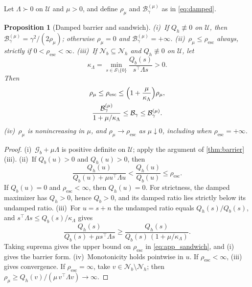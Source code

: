 \documentclass[11pt]{article}
\newtheorem{proposition}{Proposition}
\newcommand{\Gb}{\mathcal{G}_{b}}
\newcommand{\Resc}{\rho_{\mathrm{esc}}}
\newcommand{\Barrier}{\mathcal{B}}
\newcommand{\U}{\mathcal{U}}
\newcommand{\rhoreg}{\rho_{\mu}}
\newcommand{\Nb}{\mathcal{N}_{b}}
\newcommand{\Nh}{\mathcal{N}_{h}}
\begin{document}
Let $\Lambda\succ0$ on $\U$ and $\mu>0$, and define $\rhoreg$ and $\Barrier^{(\mu)}_\gamma$ as in \cref{eq:damped}.

\begin{proposition}[Damped barrier and sandwich]
\label{prop:damped}
(i)~If $Q_h\not\equiv0$ on $\U$, then $\Barrier^{(\mu)}_\gamma=\gamma^2/(2\rhoreg)$; otherwise $\rhoreg=0$ and $\Barrier^{(\mu)}_\gamma=+\infty$.
(ii)~$\rhoreg\le\Resc$ always, strictly if $0<\Resc<\infty$.
(iii)~If $\Nb\subseteq\Nh$ and $Q_h\not\equiv0$ on $\U$, let
\begin{equation*}
\kappa_\Lambda=\min_{s\in\mathcal S\setminus\{0\}}\frac{Q_b(s)}{s^\top\Lambda s}>0 .
\end{equation*}
Then
\begin{equation}
\begin{gathered}
\rhoreg\le\Resc\le\Bigl(1+\frac{\mu}{\kappa_\Lambda}\Bigr)\rhoreg,\\
\frac{\Barrier^{(\mu)}_\gamma}{1+\mu/\kappa_\Lambda}\le\Barrier_\gamma\le\Barrier^{(\mu)}_\gamma .
\end{gathered}
\label{eq:app_sandwich}
\end{equation}
(iv)~$\rhoreg$ is nonincreasing in $\mu$, and $\rhoreg\to\Resc$ as $\mu\downarrow0$, including when $\Resc=+\infty$.
\end{proposition}
\begin{proof}
(i)~$\Gb+\mu\Lambda$ is positive definite on $\U$; apply the argument of \cref{thm:barrier}(iii).
(ii)~If $Q_b(u)>0$ and $Q_h(u)>0$, then
\begin{equation*}
\frac{Q_h(u)}{Q_b(u)+\mu u^\top\Lambda u}<\frac{Q_h(u)}{Q_b(u)}\le\Resc .
\end{equation*}
If $Q_b(u)=0$ and $\Resc<\infty$, then $Q_h(u)=0$. For strictness, the damped maximizer has $Q_h>0$, hence $Q_b>0$, and its damped ratio lies strictly below its undamped ratio.
(iii)~For $u=s+n$ the undamped ratio equals $Q_h(s)/Q_b(s)$, and $s^\top\Lambda s\le Q_b(s)/\kappa_\Lambda$ gives
\begin{equation*}
\frac{Q_h(s)}{Q_b(s)+\mu s^\top\Lambda s}\ge\frac{Q_h(s)}{Q_b(s)\,(1+\mu/\kappa_\Lambda)} .
\end{equation*}
Taking suprema gives the upper bound on $\Resc$ in \cref{eq:app_sandwich}, and (i) gives the barrier form.
(iv)~Monotonicity holds pointwise in $u$. If $\Resc<\infty$, (iii) gives convergence. If $\Resc=\infty$, take $v\in\Nb\setminus\Nh$; then $\rhoreg\ge Q_h(v)/(\mu\,v^\top\Lambda v)\to\infty$.
\end{proof}
\end{document}
